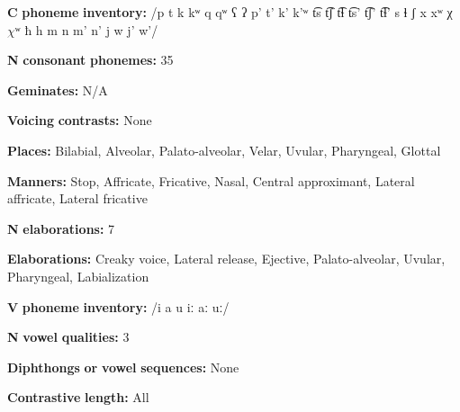 \begin{styleBody}
\textbf{C} \textbf{phoneme} \textbf{inventory:} /p t k kʷ q qʷ ʕ ʔ p’ t’ k’ k’ʷ t͡s t͡ʃ t͡ɬ t͡s’ t͡ʃ’ t͡ɬ’ s ɬ ʃ x xʷ χ $\chi ʷ$ ħ h m n m’ n’ j w j’ w’/
\end{styleBody}

\begin{styleBody}
\textbf{N} \textbf{consonant} \textbf{phonemes:} 35
\end{styleBody}

\begin{styleBody}
\textbf{Geminates:} N/A
\end{styleBody}

\begin{styleBody}
\textbf{Voicing} \textbf{contrasts:} None
\end{styleBody}

\begin{styleBody}
\textbf{Places:} Bilabial, Alveolar, Palato-alveolar, Velar, Uvular, Pharyngeal, Glottal
\end{styleBody}

\begin{styleBody}
\textbf{Manners:} Stop, Affricate, Fricative, Nasal, Central approximant, Lateral affricate, Lateral fricative
\end{styleBody}

\begin{styleBody}
\textbf{N} \textbf{elaborations:} 7
\end{styleBody}

\begin{styleBody}
\textbf{Elaborations:} Creaky voice, Lateral release, Ejective, Palato-alveolar, Uvular, Pharyngeal, Labialization
\end{styleBody}

\begin{styleBody}
\textbf{V} \textbf{phoneme} \textbf{inventory:} /i a u iː aː uː/
\end{styleBody}

\begin{styleBody}
\textbf{N} \textbf{vowel} \textbf{qualities:} 3
\end{styleBody}

\begin{styleBody}
\textbf{Diphthongs} \textbf{or} \textbf{vowel} \textbf{sequences:} None
\end{styleBody}

\begin{styleBody}
\textbf{Contrastive} \textbf{length:} All
\end{styleBody}

